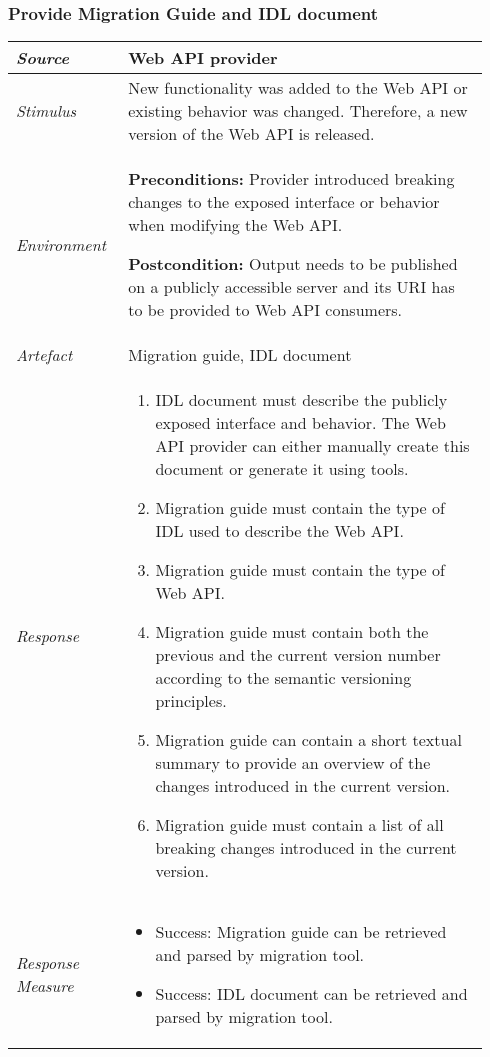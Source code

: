 \subsubsection{Provide Migration Guide and IDL document}
\label{subsubsec:UseCase:MigGuideIDL}

\vspace{-2mm}
\begin{center}
    \def\arraystretch{1.5}
    \begin{longtable}{ p{0.22\linewidth} p{0.72\linewidth} }
    \hline
        \textit{Source} & Web API provider\\
    \hline
        \textit{Stimulus} & New functionality was added to the Web API or existing behavior was changed. Therefore, a new version of the Web API is released. \\
    \hline
    	\textit{Environment} & \textbf{Preconditions:} Provider introduced breaking changes to the exposed interface or behavior when modifying the Web API.
    	
    	\textbf{Postcondition:} Output needs to be published on a publicly accessible server and its URI has to be provided to Web API consumers.
    	\\
    \hline
    	\textit{Artefact} & Migration guide, IDL document\\
    \hline
    \textit{Response} &
    \vspace{-5.1mm}
    \begin{enumerate}[itemindent=-9pt, leftmargin=14pt, itemsep=0pt, align=left]
    	\item IDL document must describe the publicly exposed interface and behavior. The Web API provider can either manually create this document or generate it using tools.
    	\item Migration guide must contain the type of IDL used to describe the Web API.
    	\item Migration guide must contain the type of Web API.
    	\item Migration guide must contain both the previous and the current version number according to the semantic versioning principles.
    	\item Migration guide can contain a short textual summary to provide an overview of the changes introduced in the current version.
    	\item Migration guide must contain a list of all breaking changes introduced in the current version. 
    \end{enumerate} \\ [-5mm]
    \hline
    \textit{Response Measure} &
    \vspace{-8.5mm}
    \begin{itemize}[itemindent=-9pt, leftmargin=14pt, itemsep=0pt, align=left]
       	\item Success: Migration guide can be retrieved and parsed by migration tool.
       	\item Success: IDL document can be retrieved and parsed by migration tool.
        \vspace{-5mm}
    \end{itemize}\\
    \hline
    \end{longtable}
\end{center}